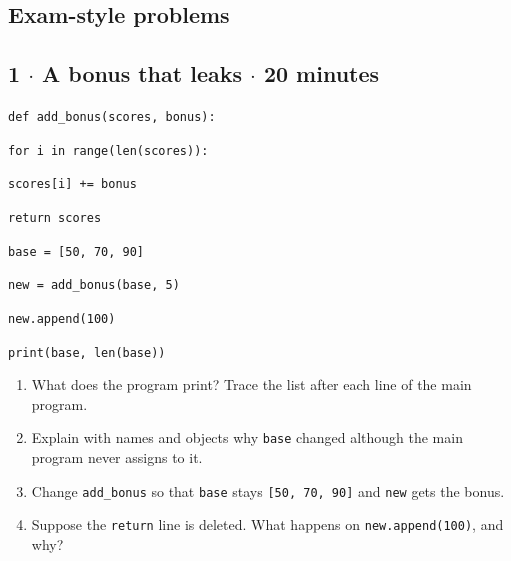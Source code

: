 \documentclass[11pt]{article}
\begin{document}
\begin{keepsection}
\section{Exam-style problems}

\begin{keepsection}
\subsection{1 \ensuremath{\cdot} A bonus that leaks \ensuremath{\cdot} 20 minutes}
\begin{tcolorbox}[colback=Paperblue,colframe=Paperblue,boxrule=0pt,arc=0pt,left=7pt,right=7pt,top=5pt,bottom=5pt]\small\sloppy
\noindent\hspace*{0em}\texttt{def add\_bonus(scores, bonus):}\par
\noindent\hspace*{1em}\texttt{for i in range(len(scores)):}\par
\noindent\hspace*{3em}\texttt{scores[i] += bonus}\par
\noindent\hspace*{1em}\texttt{return scores}\par
\noindent\hspace*{0em}\texttt{}\par
\noindent\hspace*{0em}\texttt{base = [50, 70, 90]}\par
\noindent\hspace*{0em}\texttt{new = add\_bonus(base, 5)}\par
\noindent\hspace*{0em}\texttt{new.append(100)}\par
\noindent\hspace*{0em}\texttt{print(base, len(base))}\par
\end{tcolorbox}

\begin{enumerate}
\item What does the program print? Trace the list after each line of the main program.
\item Explain with names and objects why \texttt{base} changed although the main program never assigns to it.
\item Change \texttt{add\_bonus} so that \texttt{base} stays \texttt{[50, 70, 90]} and \texttt{new} gets the bonus.
\item Suppose the \texttt{return} line is deleted. What happens on \texttt{new.append(100)}, and why?
\end{enumerate}


\end{keepsection}
\end{keepsection}
\end{document}
